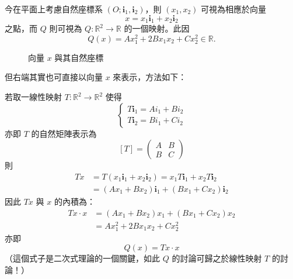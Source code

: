 今在平面上考慮自然座標系 $(O; \mathbf{i}_1, \mathbf{i}_2)$，則 $(x_1, x_2)$ 可視為相應於向量
\[
x = x_1 \mathbf{i}_1 + x_2 \mathbf{i}_2
\]
之點，而 $Q$ 則可視為 $Q: \mathbb{R}^2 \to \mathbb{R}$ 的一個映射。此因
\[
Q(x) = Ax_1^2 + 2Bx_1 x_2 + Cx_2^2 \in \mathbb{R}.
\]

\begin{figure}[htbp]
\centering
{}
\caption{向量 $x$ 與其自然座標}
\label{fig:b4s-ch4-fig2-1}
\end{figure}

但右端其實也可直接以向量 $x$ 來表示，方法如下：

若取一線性映射 $T: \mathbb{R}^2 \to \mathbb{R}^2$ 使得
\[
\begin{cases}
T\mathbf{i}_1 = Ai_1 + Bi_2 \\
T\mathbf{i}_2 = Bi_1 + Ci_2
\end{cases}
\]
亦即 $T$ 的自然矩陣表示為
\[
[T] = \begin{pmatrix} A & B \\ B & C \end{pmatrix}
\]
則
\[
\begin{aligned}
Tx &= T(x_1 \mathbf{i}_1 + x_2 \mathbf{i}_2) = x_1 T\mathbf{i}_1 + x_2 T\mathbf{i}_2 \\
&= (Ax_1 + Bx_2)\mathbf{i}_1 + (Bx_1 + Cx_2)\mathbf{i}_2
\end{aligned}
\]
因此 $Tx$ 與 $x$ 的內積為\footnotemark：\label{note:b4s-ch4-tx-image}
\[
\begin{aligned}
Tx \cdot x &= (Ax_1 + Bx_2)x_1 + (Bx_1 + Cx_2)x_2 \\
&= Ax_1^2 + 2Bx_1 x_2 + Cx_2^2
\end{aligned}
\]
亦即
\begin{equation}
Q(x) = Tx \cdot x
\label{eq:b4s-ch4-quadratic-form-inner-prod}
\end{equation}
（這個式子是二次式理論的一個關鍵，如此 $Q$ 的討論可歸之於線性映射 $T$ 的討論！）

